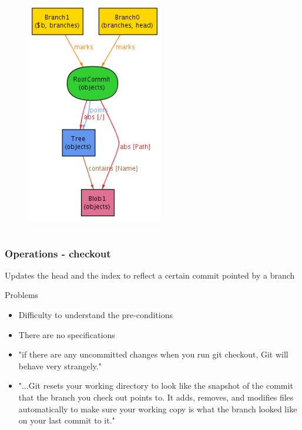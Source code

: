 \documentclass{beamer}
\begin{document}
\begin{frame}[fragile]
\begin{columns}[c]
\begin{figure}
         \includegraphics[width=0.90\textwidth]{images/branch2.png}
      \end{figure}
   \end{columns}
\end{frame}

\begin{frame}[fragile]
   \frametitle{Operations - checkout}
      Updates the head and the index to reflect a certain commit pointed by a
      branch
   \begin{block}{Problems}
      \begin{itemize}
         \item Difficulty to understand the pre-conditions
         \item There are no specifications
	 \item "if there are any uncommitted changes when you run git checkout,
	 Git will behave very strangely."
	 \item "...Git resets your working directory to look like the 
	 snapshot of the commit that the branch you check out points to. 
	 It adds, removes, and modifies files automatically to make 
	 sure your working copy is what the branch looked like on your last commit to it."
     \end{itemize}
   \end{block}
\end{frame}
\end{document}
